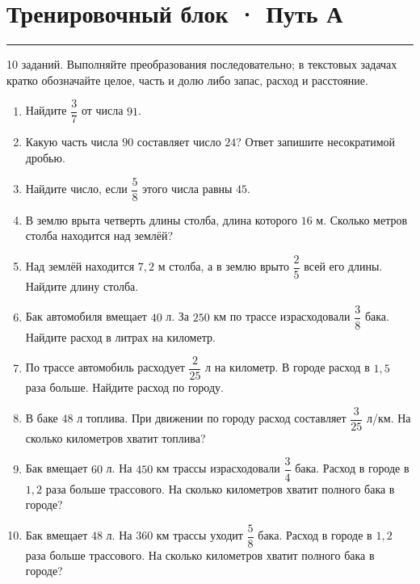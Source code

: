 \documentclass[a4paper,12pt]{article}
\newcommand{\sect}[1]{\section*{#1}\vspace{-3pt}\noindent\textcolor{accent}{\rule{\linewidth}{0.5pt}}\vspace{3pt}}
\begin{document}
\sect{Тренировочный блок · Путь А}
\textcolor{softgray}{\small 10 заданий. Выполняйте преобразования последовательно; в текстовых задачах кратко обозначайте целое, часть и долю либо запас, расход и расстояние.}
\vspace{3mm}
\begin{enumerate}
\item Найдите $\dfrac37$ от числа $91$.
\item Какую часть числа $90$ составляет число $24$? Ответ запишите несократимой дробью.
\item Найдите число, если $\dfrac58$ этого числа равны $45$.
\item В землю врыта четверть длины столба, длина которого $16$ м. Сколько метров столба находится над землёй?
\item Над землёй находится $7{,}2$ м столба, а в землю врыто $\dfrac25$ всей его длины. Найдите длину столба.
\item Бак автомобиля вмещает $40$ л. За $250$ км по трассе израсходовали $\dfrac38$ бака. Найдите расход в литрах на километр.
\item По трассе автомобиль расходует $\dfrac2{25}$ л на километр. В городе расход в $1{,}5$ раза больше. Найдите расход по городу.
\item В баке $48$ л топлива. При движении по городу расход составляет $\dfrac3{25}$ л/км. На сколько километров хватит топлива?
\item Бак вмещает $60$ л. На $450$ км трассы израсходовали $\dfrac34$ бака. Расход в городе в $1{,}2$ раза больше трассового. На сколько километров хватит полного бака в городе?
\item Бак вмещает $48$ л. На $360$ км трассы уходит $\dfrac58$ бака. Расход в городе в $1{,}2$ раза больше трассового. На сколько километров хватит полного бака в городе?
\end{enumerate}
\clearpage
\end{document}
